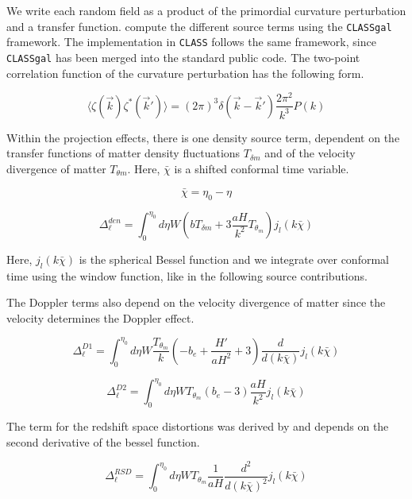 We write each random field as a product of the primordial curvature perturbation and a transfer function. \cite{dallarmi_dipole_2022} compute the different source terms using the {\tt CLASSgal} framework. The implementation in {\tt CLASS} follows the same framework, since {\tt CLASSgal} has been merged into the standard public code. The two-point correlation function of the curvature perturbation has the following form.

\begin{equation}
    \langle \zeta(\vec{k})\zeta^*(\vec{k}')\rangle = (2\pi)^3 \delta(\vec{k}-\vec{k}')\frac{2\pi^2}{k^3}P(k)
\end{equation}

Within the projection effects, there is one density source term, dependent on the transfer functions of matter density fluctuations $T_{\delta m}$ and of the velocity divergence of matter $T_{\theta m}$. Here, $\bar{\chi}$ is a shifted conformal time variable.

\begin{equation}
    \bar{\chi} = \eta_0 - \eta 
\end{equation}


\begin{equation}
    \Delta_\ell^{den}=\int_0^{\eta_0} d\eta W \left(b T_{\delta m} +3 \frac{aH}{k^2} T_{\theta_m}\right)j_l(k \bar{\chi})
\end{equation}

Here, $j_l(k \bar{\chi})$ is the spherical Bessel function and we integrate over conformal time using the window function, like in the following source contributions.

The Doppler terms also depend on the velocity divergence of matter since the velocity determines the Doppler effect.

\begin{equation}
    \Delta_\ell^{D1}=\int_0^{\eta_0} d\eta W \frac{T_{\theta_m}}{k} \left(-b_e + \frac{H'}{aH^2}+3\right)\frac{d}{d(k\bar{\chi})} j_l(k \bar{\chi})
\end{equation}

\begin{equation}
    \Delta_\ell^{D2}=\int_0^{\eta_0} d\eta W T_{\theta_m}(b_e-3) \frac{aH}{k^2} j_l(k \bar{\chi})
\end{equation}

The term for the redshift space distortions was derived by \cite{kaiser_clustering_1987} and depends on the second derivative of the bessel function.

\begin{equation}
    \Delta_\ell^{RSD}=\int_0^{\eta_0} d\eta W T_{\theta_m} \frac{1}{aH}\frac{d^2}{d(k\bar{\chi})^2} j_l(k \bar{\chi})
\end{equation}

